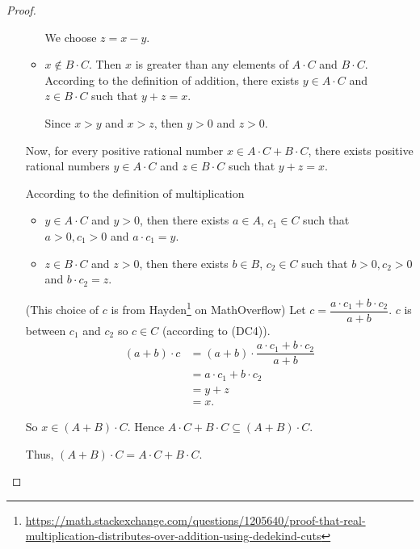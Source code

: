 \begin{proof}
\begin{enumerate}[label={(F\arabic*)}, start=5]
\begin{itemize}
                        We choose $z = x - y$.
                  \item $x\notin B\cdot C$. Then $x$ is greater than any elements of $A\cdot C$ and $B\cdot C$. According to the definition of addition, there exists $y\in A\cdot C$ and $z\in B\cdot C$ such that $y + z = x$.

                        Since $x > y$ and $x > z$, then $y > 0$ and $z > 0$.
              \end{itemize}

              Now, for every positive rational number $x\in A\cdot C + B\cdot C$, there exists positive rational numbers $y\in A\cdot C$ and $z\in B\cdot C$ such that $y + z = x$.

              According to the definition of multiplication
              \begin{itemize}
                  \item $y\in A\cdot C$ and $y > 0$, then there exists $a\in A$, $c_{1}\in C$ such that $a > 0, c_{1} > 0$ and $a\cdot c_{1} = y$.
                  \item $z\in B\cdot C$ and $z > 0$, then there exists $b\in B$, $c_{2}\in C$ such that $b > 0, c_{2} > 0$ and $b\cdot c_{2} = z$.
              \end{itemize}

              (This choice of $c$ is from Hayden\footnote{\url{https://math.stackexchange.com/questions/1205640/proof-that-real-multiplication-distributes-over-addition-using-dedekind-cuts}} on MathOverflow) Let $c = \dfrac{a\cdot c_{1} + b\cdot c_{2}}{a + b}$. $c$ is between $c_{1}$ and $c_{2}$ so $c\in C$ (according to (DC4)).
              \begin{align*}
                  (a + b)\cdot c & = (a + b)\cdot\dfrac{a\cdot c_{1} + b\cdot c_{2}}{a + b} \\
                                 & = a\cdot c_{1} + b\cdot c_{2}                            \\
                                 & = y + z                                                  \\
                                 & = x.
              \end{align*}

              So $x\in (A + B)\cdot C$. Hence $A\cdot C + B\cdot C\subseteq (A + B)\cdot C$.

              Thus, $(A + B)\cdot C = A\cdot C + B\cdot C$.

              \bigskip


\end{enumerate}
\end{proof}
